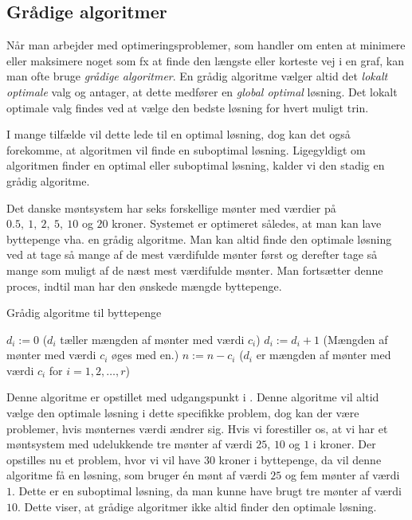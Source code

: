 \subsection{Grådige algoritmer}
Når man arbejder med optimeringsproblemer, som handler om enten at minimere eller maksimere noget som fx at finde den længste eller korteste vej i en graf, kan man ofte bruge \emph{grådige algoritmer}.
En grådig algoritme vælger altid det \emph{lokalt optimale} valg og antager, at dette medfører en \emph{global optimal} løsning. Det lokalt optimale valg findes ved at vælge den bedste løsning for hvert muligt trin.

I mange tilfælde vil dette lede til en optimal løsning, dog kan det også forekomme, at algoritmen vil finde en suboptimal løsning. Ligegyldigt om algoritmen finder en optimal eller suboptimal løsning, kalder vi den stadig en grådig algoritme.

\begin{exmp}
Det danske møntsystem har seks forskellige mønter med værdier på $0.5,\ 1,\ 2,\ 5,\ 10$ og $20$ kroner. Systemet er optimeret således, at man kan lave byttepenge vha. en grådig algoritme. Man kan altid finde den optimale løsning ved at tage så mange af de mest værdifulde mønter først og derefter tage så mange som muligt af de næst mest værdifulde mønter. Man fortsætter denne proces, indtil man har den ønskede mængde byttepenge.
\begin{algorithm} [H]
\caption{Grådig algoritme til byttepenge}
\begin{algorithmic}[1]

\EndProcedure
{}
    \State $d_i:=0$ ($d_i$ tæller mængden af mønter med værdi $c_i$)
    	\State $d_i := d_i+1$ (Mængden af mønter med værdi $c_i$ øges med en.)
    	\State $n := n-c_i$
\EndWhile
\EndFor
\State ($d_i$ er mængden af mønter med værdi $c_i$ for $i=1,2,\dotsc,r$)
\end{algorithmic}
\end{algorithm}
Denne algoritme er opstillet med udgangspunkt i \citep{dmat}. Denne algoritme vil altid vælge den optimale løsning i dette specifikke problem, dog kan der være problemer, hvis mønternes værdi ændrer sig. 
Hvis vi forestiller os, at vi har et møntsystem med udelukkende tre mønter af værdi $25$, $10$ og $1$ i kroner. Der opstilles nu et problem, hvor vi vil have $30$ kroner i byttepenge, da vil denne algoritme få en løsning, som bruger én mønt af værdi $25$ og fem mønter af værdi $1$. Dette er en suboptimal løsning, da man kunne have brugt tre mønter af værdi $10$.
Dette viser, at grådige algoritmer ikke altid finder den optimale løsning.
\end{exmp}
